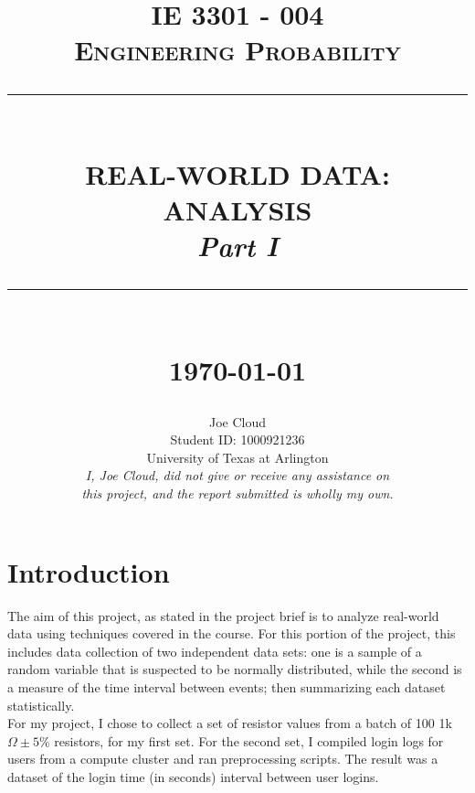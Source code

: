 \documentclass[10pt]{report}
\newcommand{\HRule}[1]{\rule{\linewidth}{#1}}
\begin{document}
\title{ \normalsize \textsc{IE 3301 - 004 \\ Engineering Probability}
		\\ [2.0cm]
		\HRule{0.5pt} \\
		\LARGE \textbf{\uppercase{Real-World Data: Analysis}} \\
        \normalsize \textit{Part I}  
		\HRule{2pt} \\ [0.5cm]
		\normalsize \today \vspace*{5\baselineskip}}

\date{}

\author{
        Joe Cloud \\
		Student ID: 1000921236 \\
        University of Texas at Arlington \\[1in]
        \textit{I, Joe Cloud, did not give or receive any assistance on }\\ 
        \textit{this project, and the report submitted is wholly my own.}}
    


\maketitle
\tableofcontents
\newpage

\sectionfont{\scshape}


\section*{Introduction}

The aim of this project, as stated in the project brief is to analyze real-world 
data using techniques covered in the course. For this portion of the project, 
this includes data collection of two independent data sets: one is a
sample of a random variable that is suspected to be normally distributed, while
the second is a measure of the time interval between events; then summarizing each
dataset statistically. \\ For my project, I chose to collect a set of resistor values
from a batch of 100 1k$\Omega \pm 5\%$ resistors, for my first set. For the second set,
I compiled login logs for users from a compute cluster and ran preprocessing scripts. 
The result was a dataset of the login time (in seconds) interval between user logins. 
\end{document}
